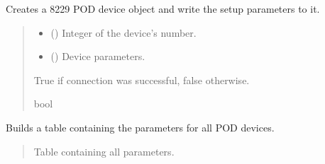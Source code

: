 \documentclass[letterpaper,10pt,english]{sphinxmanual}
\begin{document}
\begin{fulllineitems}
\begin{fulllineitems}
\label{\detokenize{Setup.SetupOneDevice:Setup.SetupOneDevice.Setup_8229.Setup8229._ConnectPODdevice}}
\pysigstartsignatures
{}
\pysigstopsignatures
\sphinxAtStartPar
Creates a 8229 POD device object and write the setup parameters to it.
\begin{quote}\begin{description}
\begin{itemize}
\item {} 
\sphinxAtStartPar
{} () \textendash{} Integer of the device’s number.

\item {} 
\sphinxAtStartPar
{} () \textendash{} Device parameters.

\end{itemize}

\sphinxAtStartPar
True if connection was successful, false otherwise.

\sphinxAtStartPar
bool

\end{description}\end{quote}

\end{fulllineitems}


\begin{fulllineitems}
\label{\detokenize{Setup.SetupOneDevice:Setup.SetupOneDevice.Setup_8229.Setup8229._GetPODdeviceParameterTable}}
\pysigstartsignatures
{}
\pysigstopsignatures
\sphinxAtStartPar
Builds a table containing the parameters for all POD devices.
\begin{quote}\begin{description}
\sphinxAtStartPar
Table containing all parameters.


\end{description}
\end{quote}
\end{fulllineitems}
\end{fulllineitems}
\end{document}
